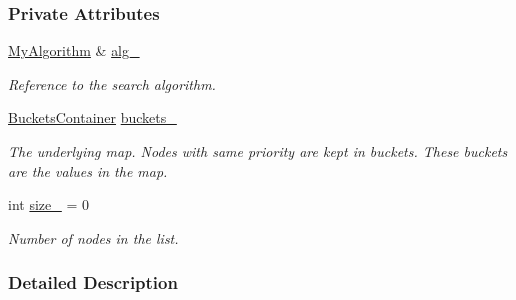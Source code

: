 \subsubsection*{Private Attributes}
\begin{DoxyCompactItemize}
\item 
\hyperlink{structslb_1_1ext_1_1policy_1_1openList_1_1BucketedStdMap__T_abe8c12b881c4c3440e5b5e3aaa72c061}{My\+Algorithm} \& \hyperlink{structslb_1_1ext_1_1policy_1_1openList_1_1BucketedStdMap__T_a68eeb55145bfb5c6b3c92856ce68b9ab}{alg\+\_\+}\hypertarget{structslb_1_1ext_1_1policy_1_1openList_1_1BucketedStdMap__T_a68eeb55145bfb5c6b3c92856ce68b9ab}{}\label{structslb_1_1ext_1_1policy_1_1openList_1_1BucketedStdMap__T_a68eeb55145bfb5c6b3c92856ce68b9ab}

\begin{DoxyCompactList}\small\item\em Reference to the search algorithm. \end{DoxyCompactList}\item 
\hyperlink{structslb_1_1ext_1_1policy_1_1openList_1_1BucketedStdMap__T_ac3244479641693cce8338fa235e988d5}{Buckets\+Container} \hyperlink{structslb_1_1ext_1_1policy_1_1openList_1_1BucketedStdMap__T_abdb4311743043511f1eb9531dd4c99c3}{buckets\+\_\+}\hypertarget{structslb_1_1ext_1_1policy_1_1openList_1_1BucketedStdMap__T_abdb4311743043511f1eb9531dd4c99c3}{}\label{structslb_1_1ext_1_1policy_1_1openList_1_1BucketedStdMap__T_abdb4311743043511f1eb9531dd4c99c3}

\begin{DoxyCompactList}\small\item\em The underlying map. Nodes with same priority are kept in buckets. These buckets are the values in the map. \end{DoxyCompactList}\item 
int \hyperlink{structslb_1_1ext_1_1policy_1_1openList_1_1BucketedStdMap__T_a070245594f62cd873b7b34feac9b98f8}{size\+\_\+} = 0\hypertarget{structslb_1_1ext_1_1policy_1_1openList_1_1BucketedStdMap__T_a070245594f62cd873b7b34feac9b98f8}{}\label{structslb_1_1ext_1_1policy_1_1openList_1_1BucketedStdMap__T_a070245594f62cd873b7b34feac9b98f8}

\begin{DoxyCompactList}\small\item\em Number of nodes in the list. \end{DoxyCompactList}\end{DoxyCompactItemize}


\subsubsection{Detailed Description}

